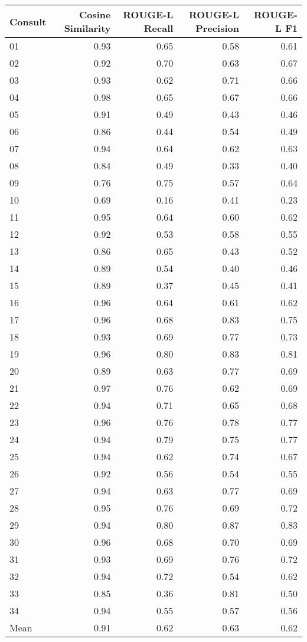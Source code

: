 \begin{tabular}{lrrrr}
\toprule
Consult & Cosine Similarity & ROUGE-L Recall & ROUGE-L Precision & ROUGE-L F1 \\
\midrule
01 & 0.93 & 0.65 & 0.58 & 0.61 \\
02 & 0.92 & 0.70 & 0.63 & 0.67 \\
03 & 0.93 & 0.62 & 0.71 & 0.66 \\
04 & 0.98 & 0.65 & 0.67 & 0.66 \\
05 & 0.91 & 0.49 & 0.43 & 0.46 \\
06 & 0.86 & 0.44 & 0.54 & 0.49 \\
07 & 0.94 & 0.64 & 0.62 & 0.63 \\
08 & 0.84 & 0.49 & 0.33 & 0.40 \\
09 & 0.76 & 0.75 & 0.57 & 0.64 \\
10 & 0.69 & 0.16 & 0.41 & 0.23 \\
11 & 0.95 & 0.64 & 0.60 & 0.62 \\
12 & 0.92 & 0.53 & 0.58 & 0.55 \\
13 & 0.86 & 0.65 & 0.43 & 0.52 \\
14 & 0.89 & 0.54 & 0.40 & 0.46 \\
15 & 0.89 & 0.37 & 0.45 & 0.41 \\
16 & 0.96 & 0.64 & 0.61 & 0.62 \\
17 & 0.96 & 0.68 & 0.83 & 0.75 \\
18 & 0.93 & 0.69 & 0.77 & 0.73 \\
19 & 0.96 & 0.80 & 0.83 & 0.81 \\
20 & 0.89 & 0.63 & 0.77 & 0.69 \\
21 & 0.97 & 0.76 & 0.62 & 0.69 \\
22 & 0.94 & 0.71 & 0.65 & 0.68 \\
23 & 0.96 & 0.76 & 0.78 & 0.77 \\
24 & 0.94 & 0.79 & 0.75 & 0.77 \\
25 & 0.94 & 0.62 & 0.74 & 0.67 \\
26 & 0.92 & 0.56 & 0.54 & 0.55 \\
27 & 0.94 & 0.63 & 0.77 & 0.69 \\
28 & 0.95 & 0.76 & 0.69 & 0.72 \\
29 & 0.94 & 0.80 & 0.87 & 0.83 \\
30 & 0.96 & 0.68 & 0.70 & 0.69 \\
31 & 0.93 & 0.69 & 0.76 & 0.72 \\
32 & 0.94 & 0.72 & 0.54 & 0.62 \\
33 & 0.85 & 0.36 & 0.81 & 0.50 \\
34 & 0.94 & 0.55 & 0.57 & 0.56 \\
Mean & 0.91 & 0.62 & 0.63 & 0.62 \\
\bottomrule
\end{tabular}
